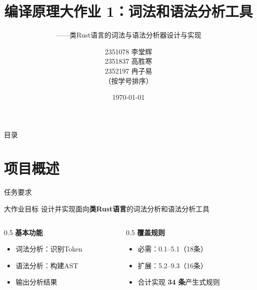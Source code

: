 \documentclass[aspectratio=169]{ctexbeamer}
\title[Compilation Principles]{%
    编译原理大作业 1：词法和语法分析工具
}
\subtitle{——类Rust语言的词法与语法分析器设计与实现}
\author[李堂辉, 高胜寒, 冉子易]{%
    2351078 李堂辉 \\ 2351837 高胜寒 \\ 2352197 冉子易 \\ \small （按学号排序）
}
\institute[Tongji University]{
    同济大学
}
\date{\today}
\begin{document}
\begin{frame}
    \titlepage
\end{frame}

\begin{frame}{目录}
    \tableofcontents
\end{frame}

\section{项目概述}

\begin{frame}{任务要求}
    \begin{block}{大作业目标}
        设计并实现面向\textbf{类Rust语言}的词法分析和语法分析工具
    \end{block}
    \vfill
    \begin{columns}[T]
        \begin{column}{0.5\textwidth}
            \textbf{基本功能}
            \begin{itemize}
                \item 词法分析：识别Token
                \item 语法分析：构建AST
                \item 输出分析结果
            \end{itemize}
        \end{column}
        \begin{column}{0.5\textwidth}
            \textbf{覆盖规则}
            \begin{itemize}
                \item 必需：0.1--5.1（18条）
                \item 扩展：5.2--9.3（16条）
                \item 合计实现 \textbf{34 条}产生式规则
            \end{itemize}
        \end{column}
    \end{columns}
\end{frame}
\end{document}
